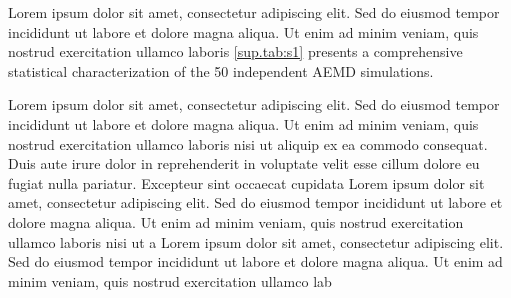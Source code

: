 \documentclass{article}
\begin{document}
Lorem ipsum dolor sit amet, consectetur adipiscing elit. Sed do eiusmod tempor incididunt ut labore et dolore magna aliqua. Ut enim ad minim veniam, quis nostrud exercitation ullamco laboris 
\ref{sup.tab:s1} presents a comprehensive statistical characterization of the 50 independent AEMD simulations.

Lorem ipsum dolor sit amet, consectetur adipiscing elit. Sed do eiusmod tempor incididunt ut labore et dolore magna aliqua. Ut enim ad minim veniam, quis nostrud exercitation ullamco laboris nisi ut aliquip ex ea commodo consequat. Duis aute irure dolor in reprehenderit in voluptate velit esse cillum dolore eu fugiat nulla pariatur. Excepteur sint occaecat cupidata
Lorem ipsum dolor sit amet, consectetur adipiscing elit. Sed do eiusmod tempor incididunt ut labore et dolore magna aliqua. Ut enim ad minim veniam, quis nostrud exercitation ullamco laboris nisi ut a
Lorem ipsum dolor sit amet, consectetur adipiscing elit. Sed do eiusmod tempor incididunt ut labore et dolore magna aliqua. Ut enim ad minim veniam, quis nostrud exercitation ullamco lab

\clearpage
\printbibliography[title=Supplementary References]
\end{document}
